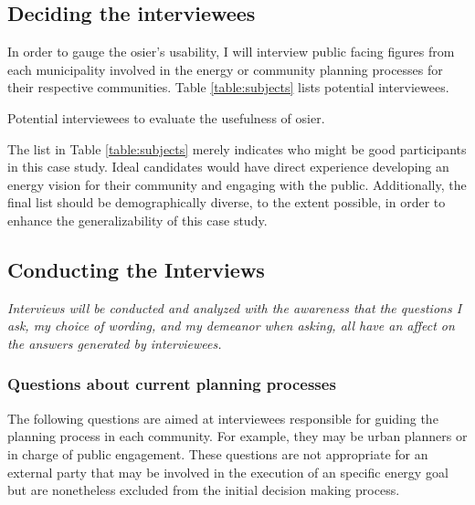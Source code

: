 \subsection{Deciding the interviewees}

In order to gauge the \ac{osier}'s usability, I will interview public facing
figures from each municipality involved in the energy or community planning
processes for their respective communities. Table \ref{table:subjects} lists
potential interviewees.

\begin{table}[ht!]
    \centering
    \caption{Potential interviewees to evaluate the usefulness of \ac{osier}.}
    \resizebox*{\textwidth}{!}{}
    \label{table:subjects}
\end{table}

The list in Table \ref{table:subjects} merely indicates who might be good
participants in this case study. Ideal candidates would have direct experience
developing an energy vision for their community and engaging with the public.
Additionally, the final list should be demographically diverse, to the extent
possible, in order to enhance the generalizability of this case study.

\subsection{Conducting the Interviews}

\textit{Interviews will be conducted and analyzed with the awareness that the
questions I ask, my choice of wording, and my demeanor when asking, all have an
affect on the answers generated by interviewees.}

\subsubsection{Questions about current planning processes}
The following questions are aimed at interviewees responsible for guiding the
planning process in each community. For example, they may be urban planners or
in charge of public engagement. These questions are not appropriate for an
external party that may be involved in the execution of an specific energy goal
but are nonetheless excluded from the initial decision making process.

